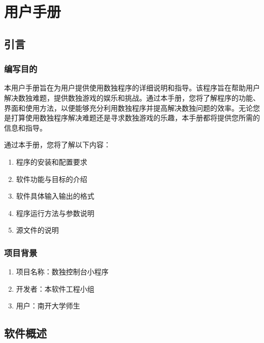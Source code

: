 \documentclass[a4paper]{article}
\begin{document}
\section{用户手册}
\subsection{引言}
\subsubsection{编写目的}
本用户手册旨在为用户提供使用数独程序的详细说明和指导。该程序旨在帮助用户解决数独难题，提供数独游戏的娱乐和挑战。通过本手册，您将了解程序的功能、界面和使用方法，以便能够充分利用数独程序并提高解决数独问题的效率。无论您是打算使用数独程序解决难题还是寻求数独游戏的乐趣，本手册都将提供您所需的信息和指导。

通过本手册，您将了解以下内容：
\begin{enumerate}
\item 程序的安装和配置要求
\item 软件功能与目标的介绍
\item 软件具体输入输出的格式
\item 程序运行方法与参数说明
\item 源文件的说明
\end{enumerate}
\subsubsection{项目背景}
\begin{enumerate}
\item 项目名称：数独控制台小程序
\item 开发者：本软件工程小组
\item 用户：南开大学师生
\end{enumerate}
\subsection{软件概述}
\end{document}
